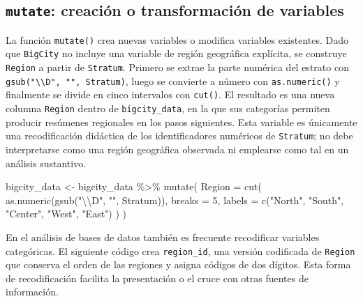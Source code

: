 \documentclass[
  spanish,
  11pt,
  letterpaper,
  oneside,
  open=any]{scrbook}
\newenvironment{Shaded}{\begin{snugshade}}{\end{snugshade}}
\newcommand{\AttributeTok}[1]{\textcolor[rgb]{0.40,0.45,0.13}{#1}}
\newcommand{\DecValTok}[1]{\textcolor[rgb]{0.68,0.00,0.00}{#1}}
\newcommand{\FunctionTok}[1]{\textcolor[rgb]{0.28,0.35,0.67}{#1}}
\newcommand{\NormalTok}[1]{\textcolor[rgb]{0.00,0.23,0.31}{#1}}
\newcommand{\OtherTok}[1]{\textcolor[rgb]{0.00,0.23,0.31}{#1}}
\newcommand{\SpecialCharTok}[1]{\textcolor[rgb]{0.37,0.37,0.37}{#1}}
\newcommand{\StringTok}[1]{\textcolor[rgb]{0.13,0.47,0.30}{#1}}
\begin{document}
\subsection{\texorpdfstring{\texttt{mutate}: creación o transformación
de
variables}{mutate: creación o transformación de variables}}\label{mutate-creacion-o-transformacion-de-variables}

La función \texttt{mutate()} crea nuevas variables o modifica variables
existentes. Dado que \texttt{BigCity} no incluye una variable de región
geográfica explícita, se construye \texttt{Region} a partir de
\texttt{Stratum}. Primero se extrae la parte numérica del estrato con
\texttt{gsub("\textbackslash{}\textbackslash{}D",\ "",\ Stratum)}, luego
se convierte a número con \texttt{as.numeric()} y finalmente se divide
en cinco intervalos con \texttt{cut()}. El resultado es una nueva
columna \texttt{Region} dentro de \texttt{bigcity\_data}, en la que sus
categorías permiten producir resúmenes regionales en los pasos
siguientes. Esta variable es únicamente una recodificación didáctica de
los identificadores numéricos de \texttt{Stratum}; no debe interpretarse
como una región geográfica observada ni emplearse como tal en un
análisis sustantivo.

\begin{Shaded}
\begin{Highlighting}[]
\NormalTok{bigcity\_data }\OtherTok{\textless{}{-}}\NormalTok{ bigcity\_data }\SpecialCharTok{\%\textgreater{}\%}
  \FunctionTok{mutate}\NormalTok{(}
    \AttributeTok{Region =} \FunctionTok{cut}\NormalTok{(}
      \FunctionTok{as.numeric}\NormalTok{(}\FunctionTok{gsub}\NormalTok{(}\StringTok{"}\SpecialCharTok{\textbackslash{}\textbackslash{}}\StringTok{D"}\NormalTok{, }\StringTok{""}\NormalTok{, Stratum)),}
      \AttributeTok{breaks =} \DecValTok{5}\NormalTok{,}
      \AttributeTok{labels =} \FunctionTok{c}\NormalTok{(}\StringTok{"North"}\NormalTok{, }\StringTok{"South"}\NormalTok{, }\StringTok{"Center"}\NormalTok{, }\StringTok{"West"}\NormalTok{, }\StringTok{"East"}\NormalTok{)}
\NormalTok{    )}
\NormalTok{  )}
\end{Highlighting}
\end{Shaded}

En el análisis de bases de datos también es frecuente recodificar
variables categóricas. El siguiente código crea \texttt{region\_id}, una
versión codificada de \texttt{Region} que conserva el orden de las
regiones y asigna códigos de dos dígitos. Esta forma de recodificación
facilita la presentación o el cruce con otras fuentes de información.
\end{document}
